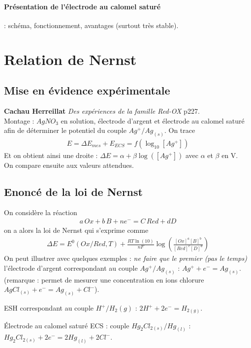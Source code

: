 \documentclass[12pt,prb,aps,epsf]{article}
\begin{document}
\paragraph{Présentation de l'électrode au calomel saturé} : schéma, fonctionnement, avantages (surtout très stable).

\section{Relation de Nernst}
\subsection{Mise en évidence expérimentale}
\textbf{Cachau Herreillat} \textit{Des expériences de la famille Red-OX} p227.\\

Montage : $AgNO_3$ en solution, électrode d'argent et électrode au calomel saturé afin de déterminer le potentiel du couple $Ag^+/Ag_{(s)}$. On trace 
\begin{eqnarray}
E = \Delta E_{mes} + E_{ECS} = f(\log_{10}[Ag^+])
\end{eqnarray}
Et on obtient ainsi une droite : $\Delta E = \alpha + \beta \log([Ag^+])$ avec $\alpha$ et $\beta$ en V.\\
On compare ensuite aux valeurs attendues.

\subsection{Enoncé de la loi de Nernst}
On considère la réaction 
\begin{eqnarray}
a\,Ox + b\,B + ne^- = C\,Red + dD
\end{eqnarray}
on a alors la loi de Nernst qui s'exprime comme
\begin{eqnarray}
\Delta E = E^0(Ox/Red,T) + \frac{RT\ln(10)}{nF}\log\left(\frac{[Ox]^{a}[B]^b}{[Red]^c[D]^d}\right)
\end{eqnarray}
On peut illustrer avec quelques exemples : \textit{ne faire que le premier (pas le temps)}\\

 l'électrode d'argent correspondant au couple $Ag^+/Ag_{(s)}$ : $Ag^+ + e^- = Ag_{(s)}$. (remarque : permet de mesurer une concentration en ions chlorure $AgCl_{(s)} + e^- = Ag_{(s)} + Cl^-$).
 
 ESH correspondant au couple $ H^+/H_2{(g)}$ : $2H^+ + 2e^- = H_{2(g)}$.
 
 Électrode au calomel saturé ECS : couple $Hg_2Cl_{2(s)}/Hg_{(l)}$ : $Hg_2Cl_{2(s)} + 2e^- = 2Hg_{(l)} + 2Cl^-$.
 
\end{document}
